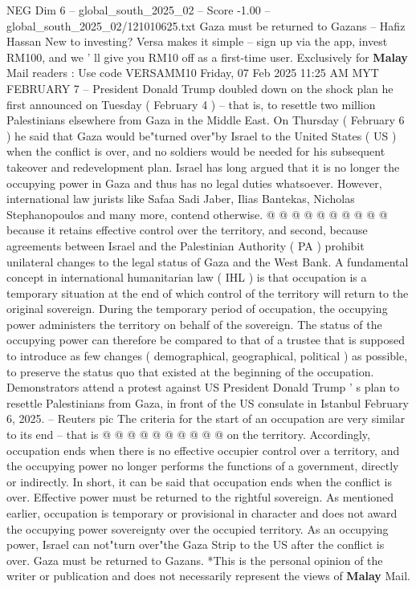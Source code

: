 \begin{textsample}{NEG Dim 6 – global\_south\_2025\_02 – Score -1.00 – global\_south\_2025\_02/121010625.txt}  \label{ex:f6_neg_041}
Gaza must be returned to Gazans -- Hafiz Hassan New to investing?
Versa makes it simple -- sign up via the app, invest RM100, and we ' ll give you RM10 off as a first-time user.
Exclusively for \textbf{Malay} Mail readers : Use code VERSAMM10 Friday, 07 Feb 2025 11:25 AM MYT FEBRUARY 7 -- President Donald Trump doubled down on the shock plan he first announced on Tuesday ( February 4 ) -- that is, to resettle two million Palestinians elsewhere from Gaza in the Middle East.
On Thursday ( February 6 ) he said that Gaza would be"turned over"by Israel to the United States ( US ) when the conflict is over, and no soldiers would be needed for his subsequent takeover and redevelopment plan.
Israel has long argued that it is no longer the occupying power in Gaza and thus has no legal duties whatsoever.
However, international law jurists like Safaa Sadi Jaber, Ilias Bantekas, Nicholas Stephanopoulos and many more, contend otherwise. @ @ @ @ @ @ @ @ @ @ because it retains effective control over the territory, and second, because agreements between Israel and the Palestinian Authority ( PA ) prohibit unilateral changes to the legal status of Gaza and the West Bank.
A fundamental concept in international humanitarian law ( IHL ) is that occupation is a temporary situation at the end of which control of the territory will return to the original sovereign.
During the temporary period of occupation, the occupying power administers the territory on behalf of the sovereign.
The status of the occupying power can therefore be compared to that of a trustee that is supposed to introduce as few changes ( demographical, geographical, political ) as possible, to preserve the status quo that existed at the beginning of the occupation.
Demonstrators attend a protest against US President Donald Trump ' s plan to resettle Palestinians from Gaza, in front of the US consulate in Istanbul February 6, 2025. -- Reuters pic The criteria for the start of an occupation are very similar to its end -- that is @ @ @ @ @ @ @ @ @ @ on the territory.
Accordingly, occupation ends when there is no effective occupier control over a territory, and the occupying power no longer performs the functions of a government, directly or indirectly.
In short, it can be said that occupation ends when the conflict is over.
Effective power must be returned to the rightful sovereign.
As mentioned earlier, occupation is temporary or provisional in character and does not award the occupying power sovereignty over the occupied territory.
As an occupying power, Israel can not"turn over"the Gaza Strip to the US after the conflict is over.
Gaza must be returned to Gazans. *This is the personal opinion of the writer or publication and does not necessarily represent the views of \textbf{Malay} Mail.

\end{textsample}
